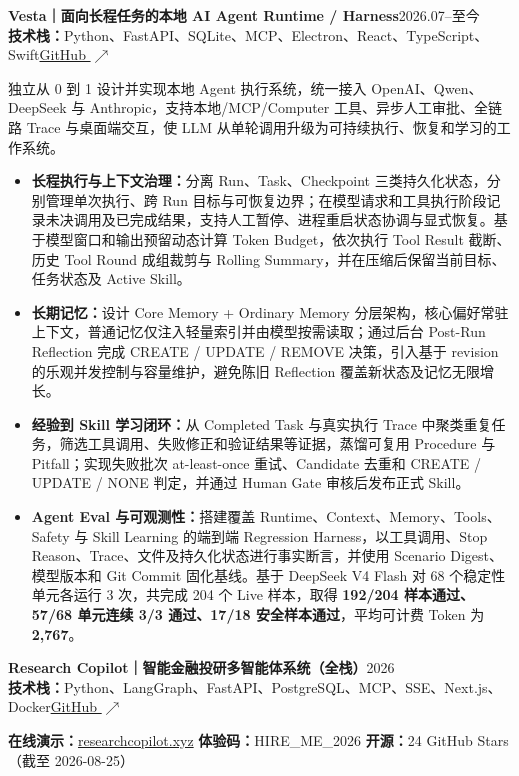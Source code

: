 \documentclass[a4paper,10pt]{article}
\newcommand{\resumeItem}[1]{\item #1}
\newcommand{\projectTitle}[4]{%
  \textbf{\large #1}\hfill\textcolor{muted}{#2}\\[-1pt]
  \textbf{技术栈：}#3\hfill\href{#4}{\textcolor{main}{GitHub $\nearrow$}}%
}
\begin{document}
\projectTitle
  {Vesta｜面向长程任务的本地 AI Agent Runtime / Harness}
  {2026.07--至今}
  {Python、FastAPI、SQLite、MCP、Electron、React、TypeScript、Swift}
  {https://github.com/Kong-lh-rgb/vesta}

\vspace{2pt}
独立从 0 到 1 设计并实现本地 Agent 执行系统，统一接入 OpenAI、Qwen、DeepSeek 与 Anthropic，支持本地/MCP/Computer 工具、异步人工审批、全链路 Trace 与桌面端交互，使 LLM 从单轮调用升级为可持续执行、恢复和学习的工作系统。

\begin{itemize}
  \resumeItem{\textbf{长程执行与上下文治理：}分离 Run、Task、Checkpoint 三类持久化状态，分别管理单次执行、跨 Run 目标与可恢复边界；在模型请求和工具执行阶段记录未决调用及已完成结果，支持人工暂停、进程重启状态协调与显式恢复。基于模型窗口和输出预留动态计算 Token Budget，依次执行 Tool Result 截断、历史 Tool Round 成组裁剪与 Rolling Summary，并在压缩后保留当前目标、任务状态及 Active Skill。}
  \resumeItem{\textbf{长期记忆：}设计 Core Memory + Ordinary Memory 分层架构，核心偏好常驻上下文，普通记忆仅注入轻量索引并由模型按需读取；通过后台 Post-Run Reflection 完成 CREATE / UPDATE / REMOVE 决策，引入基于 revision 的乐观并发控制与容量维护，避免陈旧 Reflection 覆盖新状态及记忆无限增长。}
  \resumeItem{\textbf{经验到 Skill 学习闭环：}从 Completed Task 与真实执行 Trace 中聚类重复任务，筛选工具调用、失败修正和验证结果等证据，蒸馏可复用 Procedure 与 Pitfall；实现失败批次 at-least-once 重试、Candidate 去重和 CREATE / UPDATE / NONE 判定，并通过 Human Gate 审核后发布正式 Skill。}
  \resumeItem{\textbf{Agent Eval 与可观测性：}搭建覆盖 Runtime、Context、Memory、Tools、Safety 与 Skill Learning 的端到端 Regression Harness，以工具调用、Stop Reason、Trace、文件及持久化状态进行事实断言，并使用 Scenario Digest、模型版本和 Git Commit 固化基线。基于 DeepSeek V4 Flash 对 68 个稳定性单元各运行 3 次，共完成 204 个 Live 样本，取得 \textbf{192/204 样本通过、57/68 单元连续 3/3 通过、17/18 安全样本通过}，平均可计费 Token 为 \textbf{2,767}。}
\end{itemize}

\vspace{3pt}
\projectTitle
  {Research Copilot｜智能金融投研多智能体系统（全栈）}
  {2026}
  {Python、LangGraph、FastAPI、PostgreSQL、MCP、SSE、Next.js、Docker}
  {https://github.com/Kong-lh-rgb/research-copilot}

\vspace{2pt}
\textbf{在线演示：}\href{https://researchcopilot.xyz}{researchcopilot.xyz}
\quad \textbf{体验码：}HIRE\_ME\_2026
\quad \textbf{开源：}24 GitHub Stars（截至 2026-08-25）
\end{document}
